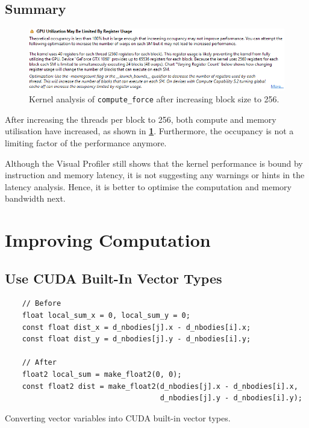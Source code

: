 \documentclass[12pt, a4paper]{article}
\let\oldcref\cref
\renewcommand{\cref}[1]{\textbf{\oldcref{#1}}}
\begin{document}
\subsection{Summary}
\begin{figure}[ht]
  \centering
  \includegraphics[width=\textwidth]{images/256_threads_per_block.png}
  \caption{Kernel analysis of \texttt{compute\_force} after increasing block size to 256.}
  \label{figure:latency_analysis_256_threads_per_block}
\end{figure}

After increasing the threads per block to 256, both compute and memory utilisation have increased, as
shown in \cref{figure:latency_analysis_256_threads_per_block}. Furthermore, the occupancy is not a
limiting factor of the performance anymore.

Although the Visual Profiler still shows that the kernel performance is bound by instruction and
memory latency, it is not suggesting any warnings or hints in the latency analysis. Hence, it is
better to optimise the computation and memory bandwidth next.

\section{Improving Computation}
\subsection{Use CUDA Built-In Vector Types \texorpdfstring{\cite{vector_types}}{}}
\begin{listing}[H]
  \begin{verbatim}
    // Before
    float local_sum_x = 0, local_sum_y = 0;
    const float dist_x = d_nbodies[j].x - d_nbodies[i].x;
    const float dist_y = d_nbodies[j].y - d_nbodies[i].y;

    // After
    float2 local_sum = make_float2(0, 0);
    const float2 dist = make_float2(d_nbodies[j].x - d_nbodies[i].x,
                                    d_nbodies[j].y - d_nbodies[i].y);
  \end{verbatim}
  \caption{Converting vector variables into CUDA built-in vector types.}
  \label{listing:cuda_vector_type_for_force}
\end{listing}
\end{document}
